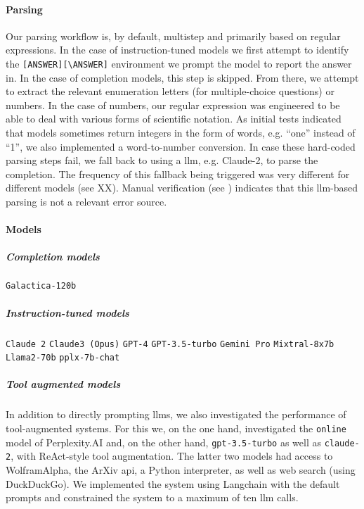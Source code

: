 \documentclass[11pt, oneside]{article}
\begin{document}
\paragraph{Parsing}
Our parsing workflow is, by default, multistep and primarily based on regular expressions.
In the case of instruction-tuned models we first attempt to identify the \texttt{[ANSWER][\textbackslash ANSWER]} environment we prompt the model to report the answer in.
In the case of completion models, this step is skipped. From there, we attempt to extract the relevant enumeration letters (for multiple-choice questions) or numbers.
In the case of numbers, our regular expression was engineered to be able to deal with various forms of scientific notation.
As initial tests indicated that models sometimes return integers in the form of words, e.g. \enquote{one} instead of \enquote{1}, we also implemented a word-to-number conversion.
In case these hard-coded parsing steps fail, we fall back to using a \gls{llm}, e.g. Claude-2, to parse the completion.
The frequency of this fallback being triggered was very different for different models (see XX).
Manual verification (see ) indicates that this \gls{llm}-based parsing is not a relevant error source.

\paragraph{Models}
\subparagraph{Completion models}
\texttt{Galactica-120b}\cite{taylor2022galactica}


\subparagraph{Instruction-tuned models} \texttt{Claude 2} \texttt{Claude3 (Opus)}\cite{anthropicClaudeModelFamily2024}
\texttt{GPT-4}\cite{openai2024gpt4}
\texttt{GPT-3.5-turbo}\cite{brown2020language}
\texttt{Gemini Pro}\cite{gemini}
\texttt{Mixtral-8x7b}\cite{jiang2024mixtral}
\texttt{Llama2-70b}\cite{touvron2023llama}
\texttt{pplx-7b-chat}

\subparagraph{Tool augmented models}
In addition to directly prompting \glspl{llm}, we also investigated the performance of tool-augmented systems.
For this we, on the one hand, investigated the \texttt{online} model of Perplexity.AI and, on the other hand, \texttt{gpt-3.5-turbo} as well as \texttt{claude-2}, with ReAct-style tool augmentation.\cite{yao2023react}
The latter two models had access to WolframAlpha, the ArXiv \gls{api}, a Python interpreter, as well as web search (using DuckDuckGo).
We implemented the system using Langchain with the default prompts and constrained the system to a maximum of ten \gls{llm} calls.
\end{document}
